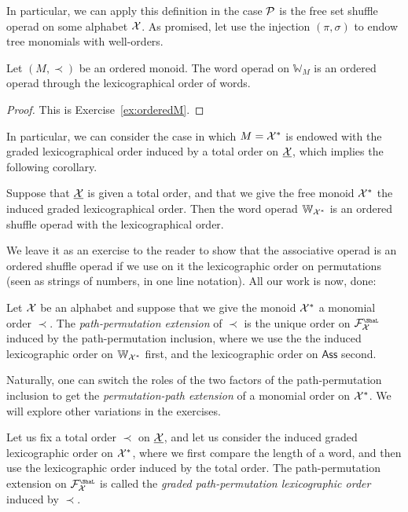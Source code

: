 In particular, we can apply this definition in the case ${\mathcal{P}}$
is the free set shuffle operad on some alphabet $\mathcal{X}$. As
promised, let use 
the injection $(\pi,\sigma)$ to endow tree monomials with
well-orders. 

\begin{proposition}
Let $(M,\prec)$ be an ordered monoid. The
word operad on $\mathbb W_M$ is an ordered operad
through the lexicographical order of words.
\end{proposition}

\begin{proof}
This is Exercise~\ref{ex:orderedM}.
\end{proof}

In particular, we can consider the case in which $M = \mathcal{X}^*$
is endowed with the graded lexicographical order induced by
a total order on $\underline{\mathcal{X}}$, which implies the following
corollary.

\begin{corollary}
Suppose that $\underline{\mathcal{X}}$ is given a total order, and that
we give the free monoid $\mathcal{X}^*$ the induced graded 
lexicographical order. Then
the word operad $\mathbb{W}_{\mathcal{X}^*}$ is an ordered
shuffle operad with the lexicographical order.
\end{corollary}

We leave it as an exercise to the reader to show that the
associative operad is an ordered shuffle operad if we
use on it the lexicographic order on permutations
(seen as strings of numbers, in one line notation).
All our work is now, done:

\begin{definition}
Let $\mathcal{X}$ be an alphabet and suppose that we
give the monoid $\mathcal{X}^*$ a monomial order $\prec$.
The \emph{path-permutation extension} of $\prec$ is the
unique order on $\FF_{\XX}^\Sha$ induced by
the path-permutation inclusion, where we use the
the induced lexicographic
order on $\mathbb{W}_{\mathcal{X}^*}$ first, and the
lexicographic order on $\mathsf{Ass}$ second.
\end{definition}

Naturally, one can switch the roles of the two
factors of the path-permutation inclusion to get
the \emph{permutation-path extension} of a monomial
order on $\mathcal{X}^*$. We will explore other variations
in the exercises.

\begin{definition}
Let us fix a total order $\prec$ on $\underline{\mathcal{X}}$, and let us
consider the induced graded lexicographic order on 
$\mathcal{X}^*$, where we first compare the length of a 
word, and then use the lexicographic order induced
by the total order. The path-permutation extension 
on $\FF_\XX^\Sha$ is called the  \emph{graded path-permutation 
lexicographic order} induced by $\prec$.
\end{definition}

